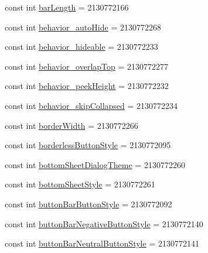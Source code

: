 \begin{DoxyCompactItemize}
\item 
const int \mbox{\hyperlink{class_f_w_p_s___app_1_1_droid_1_1_resource_1_1_attribute_afbc47c83bb46d752350a9956cfc1a7d5}{bar\+Length}} = 2130772166
\item 
const int \mbox{\hyperlink{class_f_w_p_s___app_1_1_droid_1_1_resource_1_1_attribute_a8f2de195bdc9ab07db5ecfad7e5561ec}{behavior\+\_\+auto\+Hide}} = 2130772268
\item 
const int \mbox{\hyperlink{class_f_w_p_s___app_1_1_droid_1_1_resource_1_1_attribute_a5d3e157b0069c60a1e748bbf2beea369}{behavior\+\_\+hideable}} = 2130772233
\item 
const int \mbox{\hyperlink{class_f_w_p_s___app_1_1_droid_1_1_resource_1_1_attribute_a52609b44777955ea69c74105621239c3}{behavior\+\_\+overlap\+Top}} = 2130772277
\item 
const int \mbox{\hyperlink{class_f_w_p_s___app_1_1_droid_1_1_resource_1_1_attribute_a1d211b46bfc2c95b54c637cbf691506c}{behavior\+\_\+peek\+Height}} = 2130772232
\item 
const int \mbox{\hyperlink{class_f_w_p_s___app_1_1_droid_1_1_resource_1_1_attribute_a9927ca542fba5e409f4a21334903fe6c}{behavior\+\_\+skip\+Collapsed}} = 2130772234
\item 
const int \mbox{\hyperlink{class_f_w_p_s___app_1_1_droid_1_1_resource_1_1_attribute_aae168cfdc886fb4ab879a3981ad7c342}{border\+Width}} = 2130772266
\item 
const int \mbox{\hyperlink{class_f_w_p_s___app_1_1_droid_1_1_resource_1_1_attribute_abd1e3aee59d3ce9e28ee2cbca40f0e41}{borderless\+Button\+Style}} = 2130772095
\item 
const int \mbox{\hyperlink{class_f_w_p_s___app_1_1_droid_1_1_resource_1_1_attribute_a35e9790a695f0b0ce8d2de8fbd12bfc6}{bottom\+Sheet\+Dialog\+Theme}} = 2130772260
\item 
const int \mbox{\hyperlink{class_f_w_p_s___app_1_1_droid_1_1_resource_1_1_attribute_a7c01aef8bdd1299cf37b7d2d27ec1ece}{bottom\+Sheet\+Style}} = 2130772261
\item 
const int \mbox{\hyperlink{class_f_w_p_s___app_1_1_droid_1_1_resource_1_1_attribute_a679eb769a408e1961bece7105eabc934}{button\+Bar\+Button\+Style}} = 2130772092
\item 
const int \mbox{\hyperlink{class_f_w_p_s___app_1_1_droid_1_1_resource_1_1_attribute_a983ed675347fcc30c712289989954a25}{button\+Bar\+Negative\+Button\+Style}} = 2130772140
\item 
const int \mbox{\hyperlink{class_f_w_p_s___app_1_1_droid_1_1_resource_1_1_attribute_a5f7e57c027f742538885c3b8441b21ca}{button\+Bar\+Neutral\+Button\+Style}} = 2130772141

\end{DoxyCompactItemize}

